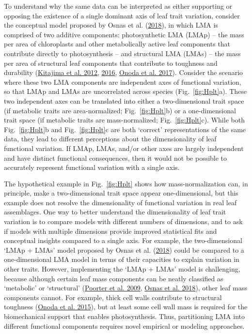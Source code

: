 \documentclass[
  12pt,
]{article}
\begin{document}
To understand why the same data can be interpreted as either supporting or opposing the existence of a single dominant axis of leaf trait variation, consider the conceptual model proposed by Osnas et al. (\protect\hyperlink{ref-Osnas2018}{2018}), in which LMA is comprised of two additive components:
photosynthetic LMA (LMAp) -- the mass per area of chloroplasts and other metabolically active leaf components that contribute directly to photosynthesis -- and structural LMA (LMAs) -- the mass per area of structural leaf components that contribute to toughness and durability (\protect\hyperlink{ref-Kitajima2012}{Kitajima et al. 2012}, \protect\hyperlink{ref-Kitajima2016}{2016}, \protect\hyperlink{ref-Onoda2017}{Onoda et al. 2017}).
Consider the scenario where these two LMA components are independent axes of functional variation, so that LMAp and LMAs are uncorrelated across species (Fig.~\ref{fig:Hplt}a).
These two independent axes can be translated into either a two-dimensional trait space (if metabolic traits are area-normalized; Fig.~\ref{fig:Hplt}b) or a one-dimensional trait space (if metabolic traits are mass-normalized; Fig.~\ref{fig:Hplt}c).
While both Fig.~\ref{fig:Hplt}b and Fig.~\ref{fig:Hplt}c are both `correct' representations of the same data, they lead to different perceptions about the dimensionality of leaf functional variation.
If LMAp, LMAs, and/or other axes are largely independent and have distinct functional consequences, then it would not be possible to accurately represent functional variation with a single axis.

The hypothetical example in Fig.~\ref{fig:Hplt} shows how mass-normalization can, in principle, make a two-dimensional trait space appear one-dimensional, but this example does not resolve the dimensionality of functional variation in real leaf assemblages.
One way to better understand the dimensionality of leaf trait variation is to compare models with different numbers of dimensions, and to ask if models with multiple dimensions provide improved statistical fits and conceptual insights compared to a single axis.
For example, the two-dimensional `LMAp + LMAs' model proposed by Osnas et al. (\protect\hyperlink{ref-Osnas2018}{2018}) could be compared to a one-dimensional LMA model in terms of their capacities to explain variation in other traits.
However, implementing the `LMAp + LMAs' model is challenging, because although certain leaf mass components can be neatly classified as `metabolic' or `structural' (\protect\hyperlink{ref-Poorter2009}{Poorter et al. 2009}, \protect\hyperlink{ref-Osnas2018}{Osnas et al. 2018}), other leaf mass components cannot.
For example, thick cell walls contribute to structural toughness (\protect\hyperlink{ref-Onoda2015}{Onoda et al. 2015}), but at least some cell wall mass is required for the biomechanical support that enables photosynthesis.
Thus, partitioning LMA into different functional components requires novel empirical or modeling approaches.
\end{document}
